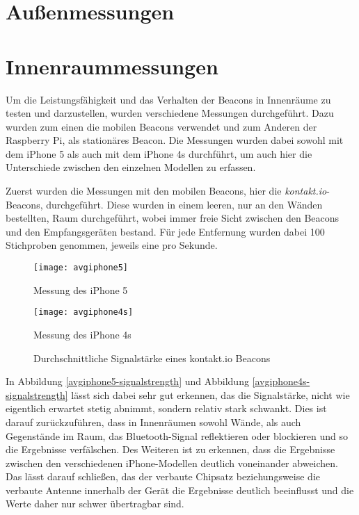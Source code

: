 \section{Außenmessungen}
\label{sec:dataandmeasurement:outdoormeasure}

\section{Innenraummessungen}
\label{sec:dataandmeasurement:indoormeasure}
Um die Leistungsfähigkeit und das Verhalten der Beacons in Innenräume zu testen und darzustellen, wurden verschiedene Messungen durchgeführt. Dazu wurden zum einen die mobilen Beacons verwendet und zum Anderen der Raspberry Pi, als stationäres Beacon.
Die Messungen wurden dabei sowohl mit dem iPhone 5 als auch mit dem iPhone 4s durchführt, um auch hier die Unterschiede zwischen den einzelnen Modellen zu erfassen.


Zuerst wurden die Messungen mit den mobilen Beacons, hier die \emph{kontakt.io}-Beacons, durchgeführt.
Diese wurden in einem leeren, nur an den Wänden bestellten, Raum durchgeführt, wobei immer freie Sicht zwischen den Beacons und den Empfangsgeräten bestand. Für jede Entfernung wurden dabei 100 Stichproben genommen, jeweils eine pro Sekunde.
\begin{figure}[h!]
	\centering
	\begin{minipage}[t]{5cm}
		\texttt{[image: avgiphone5]}
		\caption{Messung des iPhone 5}
		\label{avgiphone5-signalstrength}
	\end{minipage}
	\hspace{2cm}
	\begin{minipage}[t]{5cm}
			\texttt{[image: avgiphone4s]}
			\caption{Messung des iPhone 4s}
			\label{avgiphone4s-signalstrength}
	\end{minipage}
		\caption{Durchschnittliche Signalstärke eines kontakt.io Beacons}
		\label{signalstrength}
\end{figure}

In Abbildung \ref{avgiphone5-signalstrength} und Abbildung \ref{avgiphone4s-signalstrength} lässt sich dabei sehr gut erkennen, das die Signalstärke, nicht wie eigentlich erwartet stetig abnimmt, sondern relativ stark schwankt. Dies ist darauf zurückzuführen, dass in Innenräumen sowohl Wände, als auch Gegenstände im Raum, das Bluetooth-Signal reflektieren oder blockieren und so die Ergebnisse verfälschen.
Des Weiteren ist zu erkennen, dass die Ergebnisse zwischen den verschiedenen iPhone-Modellen deutlich voneinander abweichen. Das lässt darauf schließen, das der verbaute Chipsatz beziehungsweise die verbaute Antenne innerhalb der Gerät die Ergebnisse deutlich beeinflusst und die Werte daher nur schwer übertragbar sind.


